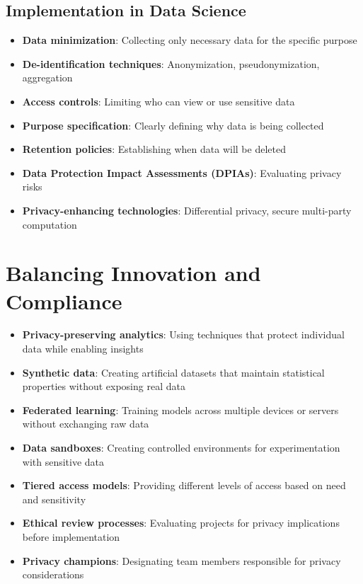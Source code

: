 \documentclass[12pt]{article}
\begin{document}
\subsection{Implementation in Data Science}
\begin{itemize}
    \item \textbf{Data minimization}: Collecting only necessary data for the specific purpose
    \item \textbf{De-identification techniques}: Anonymization, pseudonymization, aggregation
    \item \textbf{Access controls}: Limiting who can view or use sensitive data
    \item \textbf{Purpose specification}: Clearly defining why data is being collected
    \item \textbf{Retention policies}: Establishing when data will be deleted
    \item \textbf{Data Protection Impact Assessments (DPIAs)}: Evaluating privacy risks
    \item \textbf{Privacy-enhancing technologies}: Differential privacy, secure multi-party computation
\end{itemize}

\section{Balancing Innovation and Compliance}

\begin{tcolorbox}[colback=green!5!white,colframe=green!75!black,title={Strategies for Balancing Innovation and Compliance}]
\begin{itemize}
    \item \textbf{Privacy-preserving analytics}: Using techniques that protect individual data while enabling insights
    \item \textbf{Synthetic data}: Creating artificial datasets that maintain statistical properties without exposing real data
    \item \textbf{Federated learning}: Training models across multiple devices or servers without exchanging raw data
    \item \textbf{Data sandboxes}: Creating controlled environments for experimentation with sensitive data
    \item \textbf{Tiered access models}: Providing different levels of access based on need and sensitivity
    \item \textbf{Ethical review processes}: Evaluating projects for privacy implications before implementation
    \item \textbf{Privacy champions}: Designating team members responsible for privacy considerations
\end{itemize}
\end{tcolorbox}
\end{document}

